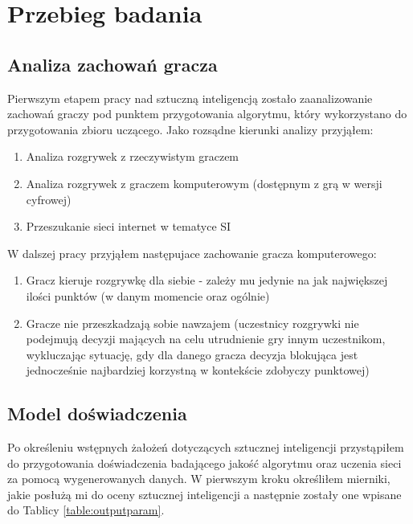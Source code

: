 \documentclass[12pt, oneside]{report}
\begin{document}
\chapter{Przebieg badania}
\section{Analiza zachowań gracza}
Pierwszym etapem pracy nad sztuczną inteligencją zostało zaanalizowanie zachowań graczy pod punktem przygotowania algorytmu, który wykorzystano do przygotowania zbioru uczącego. Jako rozsądne kierunki analizy przyjąłem:
	\begin{enumerate}
		\item{Analiza rozgrywek z rzeczywistym graczem}
		\item{Analiza rozgrywek z graczem komputerowym (dostępnym z grą w wersji cyfrowej)}
		\item{Przeszukanie sieci internet w tematyce SI}
	\end{enumerate}
W dalszej pracy przyjąłem następujace zachowanie gracza komputerowego:
\begin{enumerate}
	\item Gracz kieruje rozgrywkę dla siebie - zależy mu jedynie na jak największej ilości punktów (w danym momencie oraz ogólnie)
	\item Gracze nie przeszkadzają sobie nawzajem (uczestnicy rozgrywki nie podejmują decyzji mających na celu utrudnienie gry innym uczestnikom, wykluczając sytuację, gdy dla danego gracza decyzja blokująca jest jednocześnie najbardziej korzystną w kontekście zdobyczy punktowej)
\end{enumerate}
\section{Model doświadczenia}
Po określeniu wstępnych żałożeń dotyczących sztucznej inteligencji przystąpiłem do przygotowania doświadczenia badającego jakość algorytmu oraz uczenia sieci za pomocą wygenerowanych danych. W pierwszym kroku określiłem mierniki, jakie posłużą mi do oceny sztucznej inteligencji a następnie zostały one wpisane do Tablicy \ref{table:outputparam}. \\ \\
\end{document}
